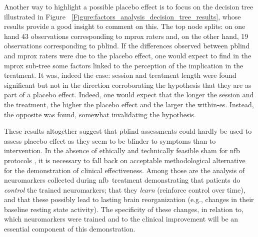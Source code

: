 Another way to highlight a possible placebo effect is to focus on the decision tree illustrated in Figure
~\ref{Figure:factors_analysis_decision_tree_results}, whose results provide a good insight to comment on this.
The top node splits: on one hand 43 observations corresponding to \gls{mprox} raters and, on the other hand, 
19 observations corresponding to \gls{pblind}. If the differences observed between \gls{pblind} and \gls{mprox} raters were 
due to the placebo effect, one would expect to find in the \gls{mprox} sub-tree some factors linked to the perception
of the implication in the treatment. It was, indeed the case: session and treatment length were found significant but not in the
direction corroborating the hypothesis that they are as part of a placebo effect. Indeed, one would expect that the
longer the session and the treatment, the higher the placebo effect and the larger the within-\gls{es}. Instead, the opposite was found, 
somewhat invalidating the hypothesis. 

These results altogether suggest that \gls{pblind} assessments could hardly be used to assess placebo effect as they seem to be blinder 
to symptoms than to intervention. In the absence of ethically \citep{Holtmann2014} and technically \citep{Birbaumer1991} feasible sham 
for \gls{nfb} protocols \citep{World-Medical-Association2000}, it is necessary to fall back on acceptable methodological alternative for 
the demonstration of clinical effectiveness. Among those are the analysis of neuromarkers collected during \gls{nfb} treatment demonstrating 
that patients do \emph{control} the trained neuromarkers; that they \emph{learn} (reinforce control over time), and that these possibly 
lead to lasting brain reorganization (e.g., changes in their baseline resting state activity). The specificity of these changes, in relation 
to, which neuromarkers were trained and to the clinical improvement will be an essential component of this demonstration.  


